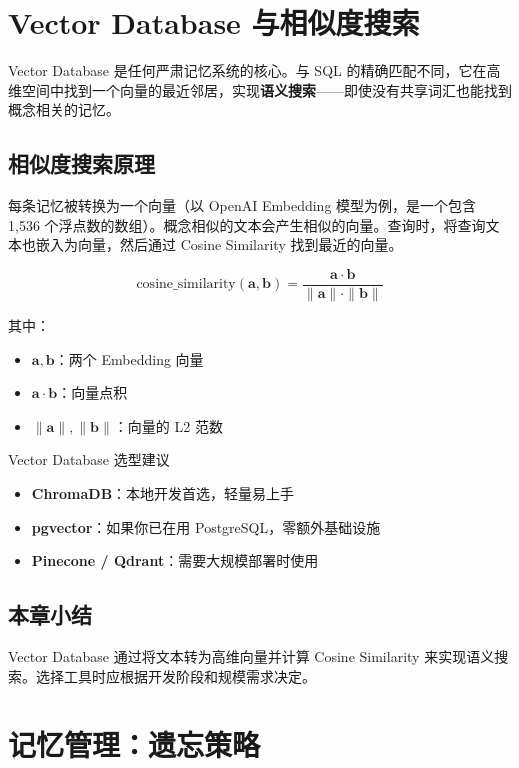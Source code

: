 \documentclass[a4paper]{article}
\begin{document}
\section{Vector Database 与相似度搜索}

Vector Database 是任何严肃记忆系统的核心。与 SQL 的精确匹配不同，它在高维空间中找到一个向量的最近邻居，实现\textbf{语义搜索}——即使没有共享词汇也能找到概念相关的记忆。

\subsection{相似度搜索原理}

每条记忆被转换为一个向量（以 OpenAI Embedding 模型为例，是一个包含 1,536 个浮点数的数组）。概念相似的文本会产生相似的向量。查询时，将查询文本也嵌入为向量，然后通过 Cosine Similarity 找到最近的向量。

$$
\text{cosine\_similarity}(\mathbf{a}, \mathbf{b}) = \frac{\mathbf{a} \cdot \mathbf{b}}{\|\mathbf{a}\| \cdot \|\mathbf{b}\|}
$$

其中：
\begin{itemize}[leftmargin=2em]
    \item $\mathbf{a}, \mathbf{b}$：两个 Embedding 向量
    \item $\mathbf{a} \cdot \mathbf{b}$：向量点积
    \item $\|\mathbf{a}\|, \|\mathbf{b}\|$：向量的 L2 范数
\end{itemize}

\begin{knowledgebox}{Vector Database 选型建议}
\begin{itemize}[leftmargin=1.5em]
    \item \textbf{ChromaDB}：本地开发首选，轻量易上手
    \item \textbf{pgvector}：如果你已在用 PostgreSQL，零额外基础设施
    \item \textbf{Pinecone / Qdrant}：需要大规模部署时使用
\end{itemize}
\end{knowledgebox}

\subsection{本章小结}

Vector Database 通过将文本转为高维向量并计算 Cosine Similarity 来实现语义搜索。选择工具时应根据开发阶段和规模需求决定。

\section{记忆管理：遗忘策略}
\end{document}
